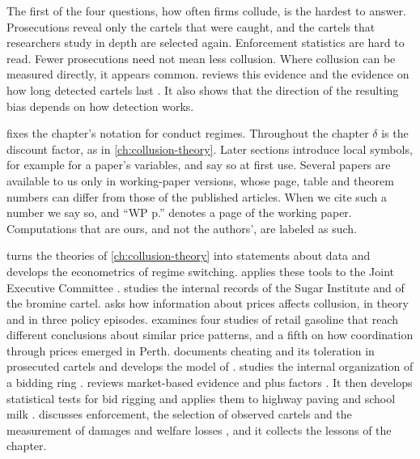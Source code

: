 The first of the four questions, how often firms collude, is the hardest to answer. Prosecutions reveal only the
cartels that were caught, and the cartels that researchers study in depth are selected again. Enforcement
statistics are hard to read. Fewer prosecutions need not mean less collusion. Where collusion can be measured
directly, it appears common.  reviews this evidence and the evidence on how long
detected cartels last
\citep{LevensteinSuslow2006}. It also shows that the direction of the resulting bias depends on how detection works.

 fixes the chapter's notation for conduct regimes. Throughout the chapter $\delta$ is the
discount factor, as in \cref{ch:collusion-theory}. Later sections introduce local symbols, for example for a
paper's variables, and say so at first use. Several papers are available to us only in working-paper versions,
whose page, table and theorem numbers can differ from those of the published articles. When we cite such a number
we say so, and ``WP p.'' denotes a page of the working paper. Computations that are ours, and not the authors', are
labeled as such.

 turns the theories of \cref{ch:collusion-theory} into statements about data and develops
the econometrics of regime switching.  applies these tools to the Joint Executive Committee
\citep{Porter1983,Ellison1994}.  studies the internal records of the Sugar Institute and of the
bromine cartel.  asks how information about prices affects collusion, in theory and in
three policy episodes.  examines four studies of retail gasoline that reach different
conclusions about similar price patterns, and a fifth on how coordination through prices emerged in Perth.
 documents cheating and its toleration in prosecuted cartels and develops the model of
\citet{BernheimMadsen2017}.  studies the internal organization of a bidding ring
\citep{Asker2010}.  reviews market-based evidence and plus factors
\citep{Kaplow2013,MarshallMarx2012}. It then develops statistical tests for bid rigging and applies them to highway
paving and school milk \citep{PorterZona1993,PorterZona1999}.  discusses enforcement, the
selection of observed cartels and the measurement of damages and welfare losses \citep{AskerNocke2021}, and it
collects the lessons of the chapter.

